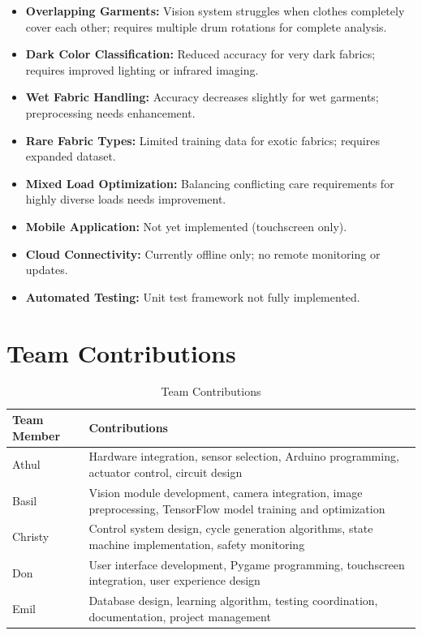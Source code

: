 \begin{itemize}
    \item \textbf{Overlapping Garments:} Vision system struggles when clothes completely cover each other; requires multiple drum rotations for complete analysis.
    \item \textbf{Dark Color Classification:} Reduced accuracy for very dark fabrics; requires improved lighting or infrared imaging.
    \item \textbf{Wet Fabric Handling:} Accuracy decreases slightly for wet garments; preprocessing needs enhancement.
    \item \textbf{Rare Fabric Types:} Limited training data for exotic fabrics; requires expanded dataset.
    \item \textbf{Mixed Load Optimization:} Balancing conflicting care requirements for highly diverse loads needs improvement.
    \item \textbf{Mobile Application:} Not yet implemented (touchscreen only).
    \item \textbf{Cloud Connectivity:} Currently offline only; no remote monitoring or updates.
    \item \textbf{Automated Testing:} Unit test framework not fully implemented.
\end{itemize}

\section{Team Contributions}

\begin{table}[H]
    \centering
    \small
    \begin{tabular}{|l|p{10cm}|}
        \hline
        \textbf{Team Member} & \textbf{Contributions} \\
        \hline
        Athul & Hardware integration, sensor selection, Arduino programming, actuator control, circuit design \\
        \hline
        Basil & Vision module development, camera integration, image preprocessing, TensorFlow model training and optimization \\
        \hline
        Christy & Control system design, cycle generation algorithms, state machine implementation, safety monitoring \\
        \hline
        Don & User interface development, Pygame programming, touchscreen integration, user experience design \\
        \hline
        Emil & Database design, learning algorithm, testing coordination, documentation, project management \\
        \hline
    \end{tabular}
    \caption{Team Contributions}
    \label{tab:contributions}
\end{table}


